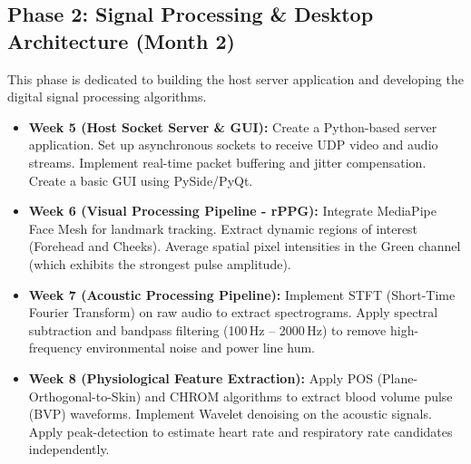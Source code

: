 \documentclass[11pt,a4paper]{article}
\begin{document}
\subsection{Phase 2: Signal Processing \& Desktop Architecture (Month 2)}
This phase is dedicated to building the host server application and developing the digital signal processing algorithms.
\begin{itemize}
    \item \textbf{Week 5 (Host Socket Server \& GUI):} Create a Python-based server application. Set up asynchronous sockets to receive UDP video and audio streams. Implement real-time packet buffering and jitter compensation. Create a basic GUI using PySide/PyQt.
    \item \textbf{Week 6 (Visual Processing Pipeline - rPPG):} Integrate MediaPipe Face Mesh for landmark tracking. Extract dynamic regions of interest (Forehead and Cheeks). Average spatial pixel intensities in the Green channel (which exhibits the strongest pulse amplitude).
    \item \textbf{Week 7 (Acoustic Processing Pipeline):} Implement STFT (Short-Time Fourier Transform) on raw audio to extract spectrograms. Apply spectral subtraction and bandpass filtering (100\,Hz – 2000\,Hz) to remove high-frequency environmental noise and power line hum.
    \item \textbf{Week 8 (Physiological Feature Extraction):} Apply POS (Plane-Orthogonal-to-Skin) and CHROM algorithms to extract blood volume pulse (BVP) waveforms. Implement Wavelet denoising on the acoustic signals. Apply peak-detection to estimate heart rate and respiratory rate candidates independently.
\end{itemize}
\end{document}
